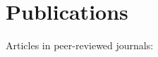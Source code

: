 \chapter*{Publications}

\noindent
Articles in peer-reviewed journals:
\begin{refsection}[ownpubs]
  \small%
  \nocite{*}
  \printbibliography[heading=none,type=article]
\end{refsection}

